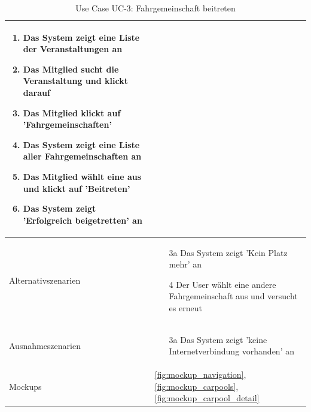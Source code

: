 \begin{table}[ht]
\begin{tabular}{ l | p{10cm} }
\begin{enumerate}
					\item Das System zeigt eine Liste der Veranstaltungen an
					\item Das Mitglied sucht die Veranstaltung und klickt darauf
					\item Das Mitglied klickt auf 'Fahrgemeinschaften'
					\item Das System zeigt eine Liste aller Fahrgemeinschaften an
					\item Das Mitglied wählt eine aus und klickt auf 'Beitreten'
					\item Das System zeigt 'Erfolgreich beigetretten' an
					\end{enumerate}
					\\ \hline
	Alternativszenarien	&	\begin{enumerate}
					\item[3a] Das System zeigt 'Kein Platz mehr' an
					\item[4] Der User wählt eine andere Fahrgemeinschaft aus und versucht es erneut
					\end{enumerate}
					\\ \hline
	Ausnahmeszenarien&	\begin{enumerate}
					\item[3a] Das System zeigt 'keine Internetverbindung vorhanden' an
					\end{enumerate}
					\\ \hline
	Mockups	 	&	\ref{fig:mockup_navigation}, \ref{fig:mockup_carpools}, \ref{fig:mockup_carpool_detail}
  \end{tabular}
   \caption{Use Case UC-3: Fahrgemeinschaft beitreten}\label{table:use_case_3}
\end{table}

